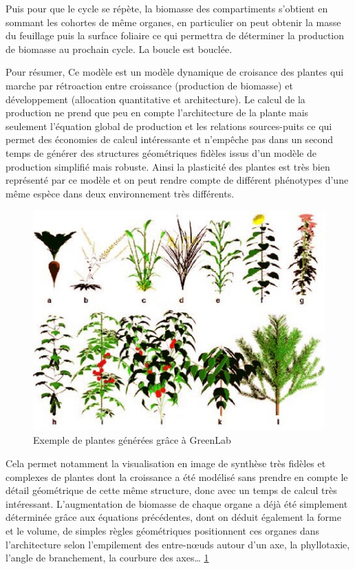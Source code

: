 {Puis pour que le cycle se répète, la biomasse des compartiments s’obtient  en sommant les cohortes de même organes, en particulier on peut obtenir la masse du feuillage puis la surface foliaire ce qui permettra de déterminer la production de biomasse au prochain cycle. La boucle est bouclée.

Pour résumer, Ce modèle est un modèle dynamique de croisance des plantes qui marche par rétroaction entre croissance (production de biomasse) et développement (allocation quantitative et architecture). Le calcul de la production ne prend que peu en compte l’architecture de la plante mais seulement l’équation global de production et les relations sources-puits ce qui permet des économies de calcul intéressante et n’empêche pas dans un second temps de générer des structures géométriques fidèles issus d’un modèle de production simplifié mais robuste. Ainsi la plasticité des plantes est très bien représenté par ce modèle et on peut rendre compte de différent phénotypes d’une même espèce dans deux environnement très différents.

\begin{figure}[h]
	\begin{center}
	
	
  \includegraphics[scale=1.0]{./img/exempleGL1.jpg}
  \caption{Exemple de plantes générées grâce à GreenLab}
  \label{fig:exempleGL1}
  
  \end{center}
\end{figure}

Cela permet notamment la visualisation en image de synthèse très fidèles et complexes de plantes dont la croissance a été modélisé sans prendre en compte le détail géométrique de cette même structure, donc avec un temps de calcul très intéressant. L’augmentation de biomasse de chaque organe a déjà été simplement déterminée grâce aux équations précédentes, dont on déduit également la forme et le volume, de simples règles géométriques positionnent ces organes dans l’architecture selon l’empilement des entre-nœuds autour d’un axe, la phyllotaxie, l’angle de branchement, la courbure des axes… \ref{fig:exempleGL1}

}
